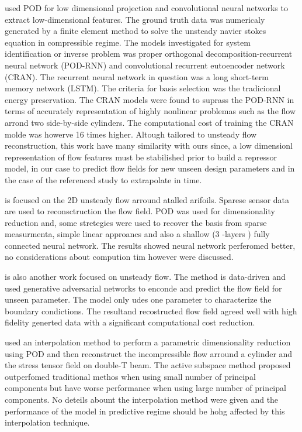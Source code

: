 \cite{bukkaAssessment2021} used POD for low dimensional projection and convolutional neural networks to extract low-dimensional features. The ground truth data was numericaly generated by a finite element method to solve the unsteady navier stokes equation in compressible regime. The models investigated for system identification or inverse problem was proper orthogonal decomposition-recurrent neural network (POD-RNN) and convolutional recurrent eutoencoder network (CRAN). The recurrent neural network in question was a long short-term memory network (LSTM). The criteria for basis selection was the tradicional energy preservation. The CRAN models were found to suprass the POD-RNN in terms of accurately representation of highly nonlinear problemas such as the flow arrond two side-by-side cylinders. The computational cost of training the CRAN molde was howerve 16 times higher. Altough tailored to unsteady flow reconstruction, this work have many similarity with ours since, a low dimensionl representation of flow features must be stabilished prior to build a repressor model, in our case to predict flow fields for new unseen design parameters and in the case of the referenced study to extrapolate in time.

\cite{carterDatadriven2021} is focused on the 2D unsteady flow arround atalled arifoils. Sparese sensor data are used to reconsctruction the flow field. POD was used for dimensionality reduction and, some stretegies were used to recover the basis from sparse measurmenta, simple linear approancs and also a shallow (3 -layers ) fully connected neural network. The results showed neural network perferomed better, no considerations about compution tim however were discussed.

\cite{chengDatadriven2020} is also another work focused on unsteady flow. The method is data-driven and used generative adversarial networks to enconde and predict the flow field for unseen parameter. The model only udes one parameter to characterize the boundary condictions. The resultand recostructed flow field agreed well with high fidelity generted data with a significant computational cost reduction.

\cite{demoNonintrusive2019} used an interpolation method to perform a parametric dimensionality reduction using POD and then reconstruct the incompressible flow arround a cylinder and the stress tensor field on double-T beam. The active subspace method proposed outperfomed traditional methos when using small number of principal components but have worse performance when using large number of principal components. No deteils abount the interpolation method were given and the performance of the model in predictive regime should be hohg affected by this interpolation technique.

